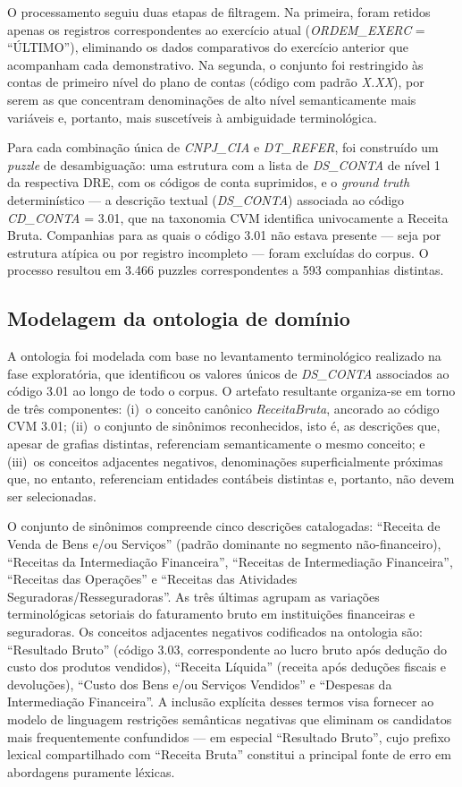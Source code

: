 \documentclass[12pt,a4paper]{article}
\begin{document}
O processamento seguiu duas etapas de filtragem. Na primeira, foram retidos apenas os registros correspondentes ao exercício atual (\textit{ORDEM\_EXERC} = ``ÚLTIMO''), eliminando os dados comparativos do exercício anterior que acompanham cada demonstrativo. Na segunda, o conjunto foi restringido às contas de primeiro nível do plano de contas (código com padrão \textit{X.XX}), por serem as que concentram denominações de alto nível semanticamente mais variáveis e, portanto, mais suscetíveis à ambiguidade terminológica.

Para cada combinação única de \textit{CNPJ\_CIA} e \textit{DT\_REFER}, foi construído um \textit{puzzle} de desambiguação: uma estrutura com a lista de \textit{DS\_CONTA} de nível 1 da respectiva DRE, com os códigos de conta suprimidos, e o \textit{ground truth} determinístico --- a descrição textual (\textit{DS\_CONTA}) associada ao código \textit{CD\_CONTA} = 3.01, que na taxonomia CVM identifica univocamente a Receita Bruta. Companhias para as quais o código 3.01 não estava presente --- seja por estrutura atípica ou por registro incompleto --- foram excluídas do corpus. O processo resultou em 3.466 puzzles correspondentes a 593 companhias distintas.

\subsection{Modelagem da ontologia de domínio}

A ontologia foi modelada com base no levantamento terminológico realizado na fase exploratória, que identificou os valores únicos de \textit{DS\_CONTA} associados ao código 3.01 ao longo de todo o corpus. O artefato resultante organiza-se em torno de três componentes: (i)~o conceito canônico \textit{ReceitaBruta}, ancorado ao código CVM 3.01; (ii)~o conjunto de sinônimos reconhecidos, isto é, as descrições que, apesar de grafias distintas, referenciam semanticamente o mesmo conceito; e (iii)~os conceitos adjacentes negativos, denominações superficialmente próximas que, no entanto, referenciam entidades contábeis distintas e, portanto, não devem ser selecionadas.

O conjunto de sinônimos compreende cinco descrições catalogadas: ``Receita de Venda de Bens e/ou Serviços'' (padrão dominante no segmento não-financeiro), ``Receitas da Intermediação Financeira'', ``Receitas de Intermediação Financeira'', ``Receitas das Operações'' e ``Receitas das Atividades Seguradoras/Resseguradoras''. As três últimas agrupam as variações terminológicas setoriais do faturamento bruto em instituições financeiras e seguradoras. Os conceitos adjacentes negativos codificados na ontologia são: ``Resultado Bruto'' (código 3.03, correspondente ao lucro bruto após dedução do custo dos produtos vendidos), ``Receita Líquida'' (receita após deduções fiscais e devoluções), ``Custo dos Bens e/ou Serviços Vendidos'' e ``Despesas da Intermediação Financeira''. A inclusão explícita desses termos visa fornecer ao modelo de linguagem restrições semânticas negativas que eliminam os candidatos mais frequentemente confundidos --- em especial ``Resultado Bruto'', cujo prefixo lexical compartilhado com ``Receita Bruta'' constitui a principal fonte de erro em abordagens puramente léxicas.
\end{document}
